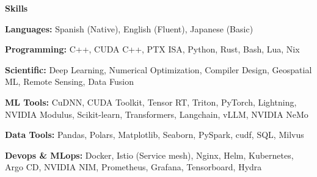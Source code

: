 \documentclass[11pt]{article}
\begin{document}
\begin{center}
    \textbf{Skills}
\end{center}

\textbf{Languages:} Spanish (Native), English (Fluent), Japanese (Basic)

\textbf{Programming:} C++, CUDA C++, PTX ISA, Python, Rust, Bash, Lua, Nix

\textbf{Scientific:} Deep Learning, Numerical Optimization, Compiler Design, Geospatial ML, Remote Sensing, Data Fusion

\textbf{ML Tools:} CuDNN, CUDA Toolkit, Tensor RT, Triton, PyTorch, Lightning, NVIDIA Modulus, Scikit-learn, Transformers, Langchain, vLLM, NVIDIA NeMo

\textbf{Data Tools:} Pandas, Polars, Matplotlib, Seaborn, PySpark, cudf, SQL, Milvus

\textbf{Devops \& MLops: } Docker, Istio (Service mesh), Nginx, Helm, Kubernetes, Argo CD, NVIDIA NIM, Prometheus, Grafana, Tensorboard, Hydra



\end{document}
